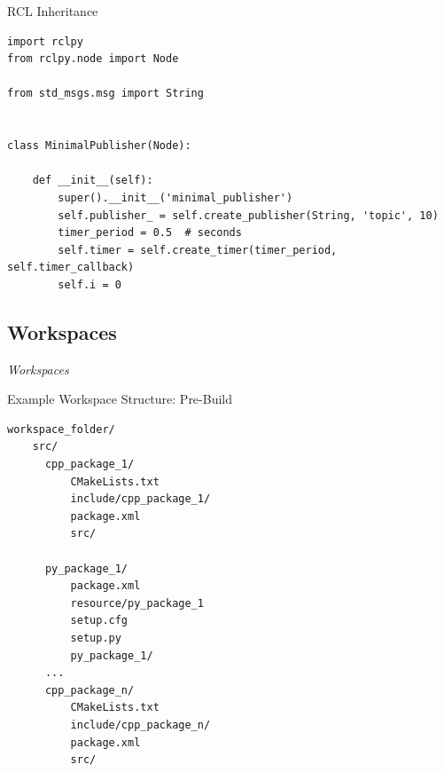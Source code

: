 \documentclass{beamer}
\begin{document}
\begin{frame}[fragile]{RCL Inheritance}
    \begingroup
    \fontsize{8pt}{10pt}\selectfont
    \begin{verbatim}
import rclpy
from rclpy.node import Node

from std_msgs.msg import String


class MinimalPublisher(Node):

    def __init__(self):
        super().__init__('minimal_publisher')
        self.publisher_ = self.create_publisher(String, 'topic', 10)
        timer_period = 0.5  # seconds
        self.timer = self.create_timer(timer_period, self.timer_callback)
        self.i = 0
    \end{verbatim}
    \endgroup

    \href{https://github.com/ros2/examples/blob/rolling/rclpy/topics/minimal_publisher/examples_rclpy_minimal_publisher/publisher_member_function.py}{}
\end{frame}

\subsection{Workspaces}
\begin{frame}{\textit{Workspaces}}
\end{frame}

\begin{frame}[fragile]{Example Workspace Structure: Pre\--Build}

    \begingroup
    \fontsize{10pt}{11pt}\selectfont
    \begin{verbatim}
workspace_folder/
    src/
      cpp_package_1/
          CMakeLists.txt
          include/cpp_package_1/
          package.xml
          src/

      py_package_1/
          package.xml
          resource/py_package_1
          setup.cfg
          setup.py
          py_package_1/
      ...
      cpp_package_n/
          CMakeLists.txt
          include/cpp_package_n/
          package.xml
          src/
    \end{verbatim}
    \endgroup
\end{frame}
\end{document}
